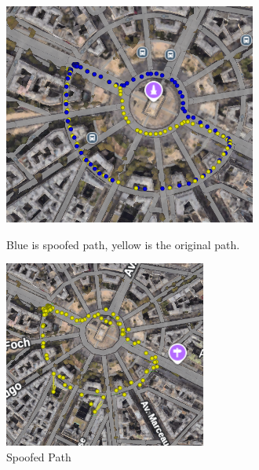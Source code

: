 \documentclass[12pt]{report}
\begin{document}
\begin{figure}[H]
  \centering
  \begin{minipage}{0.48\textwidth}
    \centering
    \includegraphics[width=\textwidth]{path2.png}
    \caption{Blue is spoofed path, yellow is the original path.}
    \label{fig:path2}
  \end{minipage}
  \hfill
  \begin{minipage}{0.48\textwidth}
    \centering
    \includegraphics[width=\textwidth]{spoofed_path2.png}
    \caption{Spoofed Path}
    \label{fig:spoofed_path2}
  \end{minipage}
\end{figure}
\end{document}

